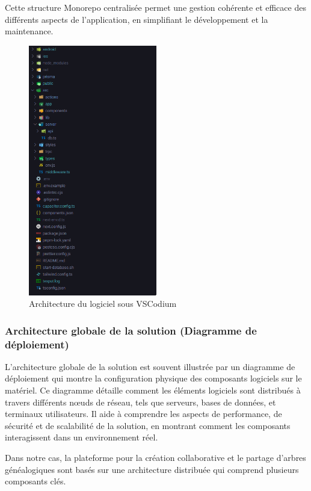 Cette structure Monorepo centralisée permet une gestion cohérente et efficace
des différents aspects de l'application, en simplifiant le développement et la maintenance.

\begin{figure}[H]
  \centering
  \includegraphics[width=0.5\textwidth]{figure/archi.png}
  \caption{Architecture du logiciel sous VSCodium}
\end{figure}

\subsubsection{Architecture globale de la solution (Diagramme de déploiement)}
L’architecture globale de la solution est souvent illustrée par un diagramme de
déploiement qui montre la configuration physique des composants logiciels sur
le matériel. Ce diagramme détaille comment les éléments logiciels sont
distribués à travers différents nœuds de réseau, tels que serveurs, bases de
données, et terminaux utilisateurs. Il aide à comprendre les aspects de
performance, de sécurité et de scalabilité de la solution, en montrant comment
les composants interagissent dans un environnement réel.

Dans notre cas, la plateforme pour la création collaborative et le partage
d’arbres généalogiques sont basés sur une architecture distribuée qui
comprend plusieurs composants clés.

